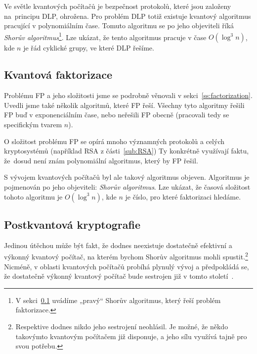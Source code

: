 \documentclass[
  program=infoi,
  biblatex=false,
  figures=true,
  glossaries,
  tables=false,
  sourcecodes=true,
  index
]{kidiplom}
\begin{document}
        Ve světle kvantových počítačů je bezpečnost protokolů, které jsou založeny na~principu DLP, ohrožena.
        Pro problém DLP totiž existuje kvantový algoritmus pracující v polynomiálním čase.
        Tomuto algoritmu se po jeho objeviteli říká \emph{Shorův algoritmus}\footnote{V sekci~\ref{sub:quantum-factoring}
        uvádíme „pravý“ Shorův algoritmus, který řeší problém faktorizace.}.
        Lze ukázat, že tento algoritmus pracuje v čase $O(\log^3{n})$, kde $n$ je řád cyklické grupy, ve které DLP řešíme.


    \subsection{Kvantová faktorizace}\label{sub:quantum-factoring}
        
        Problému FP a jeho složitosti jsme se podrobně věnovali v sekci~\ref{ss:factorization}.
        Uvedli jsme také několik algoritmů, které FP řeší.
        Všechny tyto algoritmy řešili FP buď v exponenciálním čase, nebo neřešili FP obecně (pracovali tedy se specifickým tvarem $n$). 

        O složitost problému FP se opírá mnoho významných protokolů a celých kryptosystémů
        (například RSA z části~\ref{sub:RSA})
        Ty konkrétně využívají faktu, že~dosud není znám polynomiální algoritmus, který by FP řešil.


        S vývojem kvantových počítačů byl ale takový algoritmus objeven.
        Algoritmus je pojmenován po jeho objeviteli: \emph{Shorův algoritmus}.
        Lze ukázat, že časová složitost tohoto algoritmu je $O(\log^3{n})$, kde $n$ je číslo, pro které faktorizaci hledáme.


    \subsection{Postkvantová kryptografie}\label{sub:post-quantum-cryptography}

        Jedinou útěchou může být fakt, že dodnes neexistuje dostatečně efektivní a výkonný kvantový počítač, na kterém
        bychom Shorův algoritmus mohli spustit.\footnote{Respektive dodnes nikdo jeho sestrojení neohlásil.
        Je možné, že někdo takovýmto kvantovým počítačem již disponuje, a jeho sílu využívá tajně pro svou potřebu.}
        Nicméně, v oblasti kvantových počítačů probíhá plynulý vývoj a předpokládá se, že dostatečně výkonný kvantový počítač
        bude sestrojen již v tomto století~\cite{graduate-course}.
\end{document}
